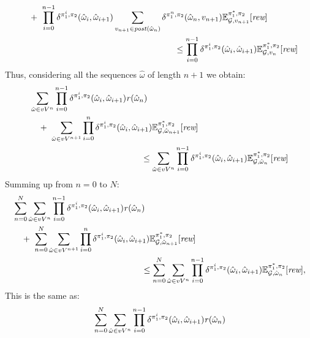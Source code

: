 \begin{myproof}
\begin{align*}
    & \quad + \ \prod^{n-1}_{i=0}\delta^{\strat{1}^i,\strat{2}}(\hat{\omega}_i, \hat{\omega}_{i+1}) \sum_{v_{n+1} \in \post(\hat{\omega}_n)}  \delta^{\strat{1}^n,\strat{2}}(\hat{\omega}_n, v_{n+1}) \Expect{\starredstrat{1}}{\strat{2}}_{\StochG,v_{n+1}}[\Rewards] \\
    & \hspace{18em} \leq 
    \prod^{n-1}_{i=0}\delta^{\strat{1}^i,\strat{2}}(\hat{\omega}_i,\hat{\omega}_{i+1}) \Expect{\starredstrat{1}}{\strat{2}}_{\StochG,v_n}[\Rewards]
  \end{align*}
  Thus,  considering all the sequences $\hat{\omega}$ of length $n+1$ we obtain:
  \begin{align*}
    & \sum_{\hat{\omega} \in vV^{n}} \prod^{n-1}_{i=0}\delta^{\strat{1}^i,\strat{2}}(\hat{\omega}_i,  \hat{\omega}_{i+1}) \reward(\hat{\omega}_n) \\
    & \quad + \ \sum_{\hat{\omega} \in vV^{n+1}} \prod^{n}_{i=0}\delta^{\strat{1}^i,\strat{2}}(\hat{\omega}_i,\hat{\omega}_{i+1})  \Expect{\starredstrat{1}}{\strat{2}}_{\StochG,\hat{\omega}_{n+1}}[\Rewards]\\
    & \hspace{13em} \leq 
	\sum_{\hat{\omega} \in vV^{n}} \prod^{n-1}_{i=0}\delta^{\strat{1}^i,\strat{2}}(\hat{\omega}_i, \hat{\omega}_{i+1}) \Expect{\starredstrat{1}}{\strat{2}}_{\StochG,\hat{\omega}_n}[\Rewards]
  \end{align*}
  Summing up from $n=0$ to $N$:
  \begin{align*}
    & \sum^{N}_{n=0}\sum_{\hat{\omega} \in vV^{n}} \prod^{n-1}_{i=0}\delta^{\strat{1}^i,\strat{2}}(\hat{\omega}_i,\hat{\omega}_{i+1}) \reward(\hat{\omega}_n) \\
    & \quad + \ \sum^{N}_{n=0} \sum_{\hat{\omega} \in vV^{n+1}} \prod^{n}_{i=0}\delta^{\strat{1}^i,\strat{2}}(\hat{\omega}_i,\hat{\omega}_{i+1})  \Expect{\starredstrat{1}}{\strat{2}}_{\StochG,\hat{\omega}_{n+1}}[\Rewards] \\
    & \hspace{15em} \leq 
	\sum^{N}_{n=0}
	\sum_{\hat{\omega} \in vV^{n}} \prod^{n-1}_{i=0}\delta^{\strat{1}^i,\strat{2}}(\hat{\omega}_i, \hat{\omega}_{i+1}) \Expect{\starredstrat{1}}{\strat{2}}_{\StochG,\hat{\omega}_n}[\Rewards],
  \end{align*}
  This is the same as:
  \begin{align*}
    & \sum^{N}_{n=0}\sum_{\hat{\omega} \in vV^{n}} \prod^{n-1}_{i=0}\delta^{\strat{1}^i,\strat{2}}(\hat{\omega}_i,\hat{\omega}_{i+1}) \reward(\hat{\omega}_n) \\

\end{align*}
\end{myproof}
